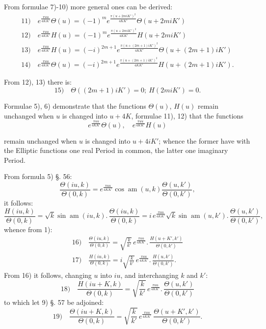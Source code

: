 \documentclass{article}
\begin{document}
From formulae 7)-10) more general ones can be derived:
\[
\begin{gathered}
\text{11)}\quad e^{\frac{\pi uu}{4KK'}}\Theta(u)=(-1)^{m}e^{\frac{\pi(u+2miK')^{2}}{4KK'}}\Theta(u+2miK')\\[1.5ex]
\text{12)}\quad e^{\frac{\pi uu}{4KK'}}H(u)=(-1)^{m}e^{\frac{\pi(u+2miK')^{2}}{4KK'}}H(u+2miK')\\[1.5ex]
\text{13)}\quad e^{\frac{\pi uu}{4KK'}}H(u)=(-i)^{2m+1}e^{\frac{\pi(u+(2m+1)iK')^{2}}{4KK'}}\Theta(u+(2m+1)iK')\\[1.5ex]
\text{14)}\quad e^{\frac{\pi uu}{4KK'}}\Theta(u)=(-i)^{2m+1}e^{\frac{\pi(u+(2m+1)iK')^{2}}{4KK'}}H(u+(2m+1)iK').
\end{gathered}
\]

From 12), 13) there is:
\[
\text{15)}\quad\Theta\left((2m+1)iK'\right)=0;\ H(2miK')=0.
\]

Formulae 5), 6) demonstrate that the functions $\Theta(u)$, $H(u)$ remain unchanged when $u$ is changed into $u+4K$, formulae 11), 12) that the functions
\[
e^{\frac{\pi uu}{4KK'}}\Theta(u),\quad e^{\frac{\pi uu}{4KK'}}H(u)
\]

remain unchanged when $u$ is changed into $u+4iK'$; whence the former have with the Elliptic functions one real Period in common, the latter one imaginary Period.

From formula 5) §. 56:
\[
\frac{\Theta(iu,k)}{\Theta(0,k)}=e^{\frac{\pi uu}{4KK'}}\cos\operatorname{am}(u,k)\frac{\Theta(u,k')}{\Theta(0,k')},
\]
it follows:
\[
\frac{H(iu,k)}{\Theta(0,k)}=\sqrt{k}\sin\operatorname{am}(iu,k).\,\frac{\Theta(iu,k)}{\Theta(0,k)}=i\,e^{\frac{\pi uu}{4KK'}}\sqrt{k}\sin\operatorname{am}(u,k').\,\frac{\Theta(u,k')}{\Theta(0,k')},
\]
whence from 1):
\[
\begin{gathered}
\text{16)}\quad\frac{\Theta(iu,k)}{\Theta(0,k)}=\sqrt{\frac{k}{k'}}\,e^{\frac{\pi uu}{4KK'}}.\,\frac{H(u+K',k')}{\Theta(0,k')}\\[1.5ex]
\text{17)}\quad\frac{H(iu,k)}{\Theta(0,k)}=i\sqrt{\frac{k}{k'}}\,e^{\frac{\pi uu}{4KK'}}.\,\frac{H(u,k')}{\Theta(0,k')}.
\end{gathered}
\]
From 16) it follows, changing $u$ into $iu$, and interchanging $k$ and $k'$:
\[
\text{18)}\quad\frac{H(iu+K,k)}{\Theta(0,k)}=\sqrt{\frac{k}{k'}}\,e^{\frac{\pi uu}{4KK'}}.\,\frac{\Theta(u,k')}{\Theta(0,k')}
\]
to which let 9) §. 57 be adjoined:
\[
\text{19)}\quad\frac{\Theta(iu+K,k)}{\Theta(0,k)}=\sqrt{\frac{k}{k'}}\,e^{\frac{\pi uu}{4KK'}}\,\frac{\Theta(u+K',k')}{\Theta(0,k')}.
\]
\end{document}
